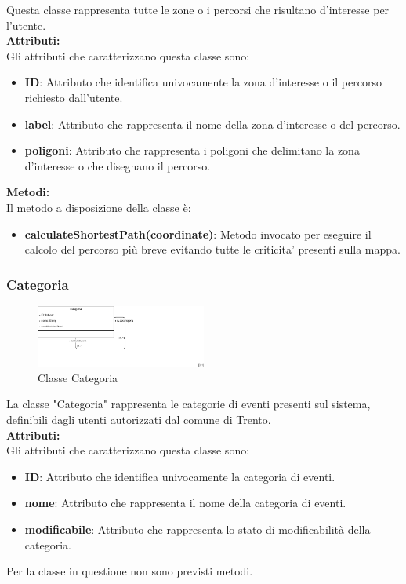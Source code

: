 \documentclass{article}
\begin{document}
Questa classe rappresenta tutte le zone o i percorsi che risultano d'interesse per l'utente.\\

\textbf{Attributi:}\\
Gli attributi che caratterizzano questa classe sono:
\begin{itemize}
	\item \textbf{ID}: Attributo che identifica univocamente la zona d'interesse o il percorso richiesto dall'utente.
	\item \textbf{label}: Attributo che rappresenta il nome della zona d'interesse o del percorso.
	\item \textbf{poligoni}: Attributo che rappresenta i poligoni che delimitano la zona d'interesse o che disegnano il percorso.\\
\end{itemize}

\textbf{Metodi:}\\
Il metodo a disposizione della classe è:
\begin{itemize}
	\item \textbf{calculateShortestPath(coordinate)}: Metodo invocato per eseguire il calcolo del percorso più breve evitando tutte le criticita' presenti sulla mappa.
\end{itemize}

\clearpage

\subsubsection{Categoria}

\begin{figure}[htbp]
	\centering
	\includegraphics[width=0.5\textwidth]{Images/Categoria-Class.png}
	\caption{Classe Categoria}
	\label{fig:categoria}
\end{figure}

La classe "Categoria" rappresenta le categorie di eventi presenti sul sistema, definibili dagli utenti autorizzati dal comune di Trento.\\

\textbf{Attributi:}\\
Gli attributi che caratterizzano questa classe sono:
\begin{itemize}
	\item \textbf{ID}: Attributo che identifica univocamente la categoria di eventi.
	\item \textbf{nome}: Attributo che rappresenta il nome della categoria di eventi.
	\item \textbf{modificabile}: Attributo che rappresenta lo stato di modificabilità della categoria.\\
\end{itemize}
Per la classe in questione non sono previsti metodi.
\end{document}
